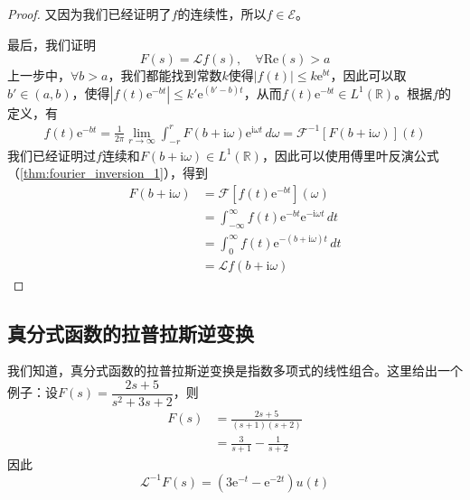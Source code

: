 \begin{proof}
    又因为我们已经证明了$f$的连续性，所以$f\in\mathcal{E} $。

    最后，我们证明
    $$F(s)=\mathcal{L} f(s),\quad \forall \mathrm{Re}(s)>a$$
    上一步中，$\forall b>a$，我们都能找到常数$k$使得$|f(t)|\leq k \mathrm{e}^{b t}$，因此可以取$b'\in(a,b)$，使得$|f(t)\mathrm{e}^{-bt}|\leq k'\mathrm{e}^{(b'-b)t}$，从而$f(t)\mathrm{e}^{-bt}\in L^1(\mathbb{R})$。根据$f$的定义，有
    \begin{align*}
        f(t)\mathrm{e}^{-b t}=\frac{1}{2\pi}\lim_{r\to\infty}\int_{-r}^{r}F(b+\mathrm{i}\omega)\mathrm{e}^{\mathrm{i}\omega t}\,d\omega
        =\mathcal{F}^{-1} [F(b+\mathrm{i}\omega)](t)
    \end{align*}
    我们已经证明过$f$连续和$F(b+\mathrm{i}\omega)\in L^1(\mathbb{R})$，因此可以使用傅里叶反演公式（\cref{thm:fourier_inversion_1}），得到
    \begin{align*}
        F(b+\mathrm{i}\omega)&=\mathcal{F} [f(t)\mathrm{e}^{-b t}](\omega)\\
        &=\int_{-\infty}^{\infty}f(t)\mathrm{e}^{-b t}\mathrm{e}^{-\mathrm{i}\omega t}\,dt\\
        &=\int_{0}^{\infty}f(t)\mathrm{e}^{-(b+\mathrm{i}\omega) t}\,dt\\
        &=\mathcal{L} f(b+\mathrm{i}\omega)
    \end{align*}
\end{proof}

\subsection{真分式函数的拉普拉斯逆变换}\label{sub:frac_laplace_inverse}
\begin{example}[真分式函数]
    我们知道，真分式函数的拉普拉斯逆变换是指数多项式的线性组合。这里给出一个例子：设$F(s)=\dfrac{2s+5}{s^2+3s+2}$，则
    \begin{align*}
        F(s)&=\frac{2s+5}{(s+1)(s+2)}\\
        &=\frac{3}{s+1}-\frac{1}{s+2}
    \end{align*}
    因此
    \[\mathcal{L}^{-1} F(s)=(3\mathrm{e}^{-t}-\mathrm{e}^{-2t})u(t)\]
\end{example}

